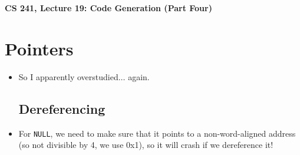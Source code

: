 \documentclass[12pt]{article}
\author{Clement Tsang}
\begin{document}
\begin{center}
    \Large\textbf{CS 241, Lecture 19: Code Generation (Part Four)}
\end{center}

\section{Pointers}
\begin{itemize}
    \item So I apparently overstudied$\dots$ again.

\subsection{Dereferencing}
    \item For \lstinline[mathescape]{NULL}, we need to make sure that it points to a non-word-aligned address (so not divisible by 4, we use 0x1), so it will crash if we dereference it!
\end{itemize}
\end{document}
